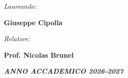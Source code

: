 \begin{minipage}[t]{0.43\textwidth}
\begin{flushleft}


\large{\emph{Laureando:}}

\large{\textbf {Giuseppe Cipolla}} 

\end{flushleft}
\end{minipage}
\begin{minipage}[t]{0.5\textwidth}
\begin{flushright}
\large{\emph{Relatore:}}

\large{\textbf {Prof. Nicolas Brunel}} 

\vspace{.5cm}



\end{flushright}
\end{minipage}

\vspace{2cm}

\begin{center}
    \emph{\textbf{ANNO ACCADEMICO 2026-2027}}
\end{center}

\restoregeometry

%
